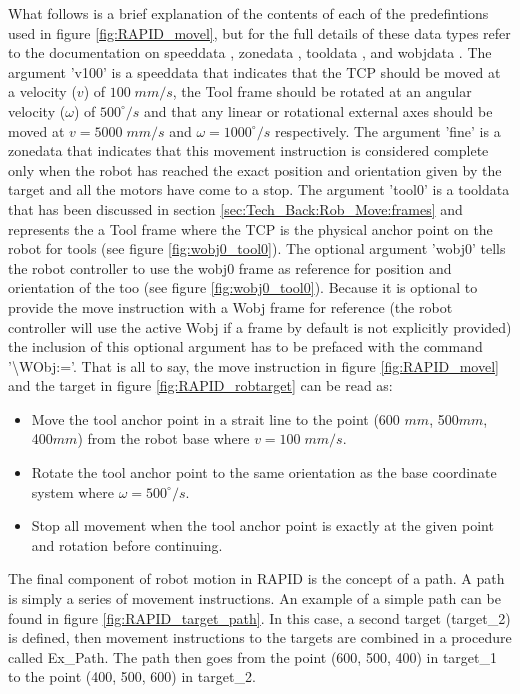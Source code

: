 \documentclass{cslthse-msc}
\begin{document}
What follows is a brief explanation of the contents of each of the predefintions used in figure \ref{fig:RAPID_movel}, but for the full details of these data types refer to the documentation on speeddata \cite[Sec. 3.76]{ABB:rapid_instructions}, zonedata \cite[Sec. 3.103]{ABB:rapid_instructions}, tooldata \cite[Sec. 3.88]{ABB:rapid_instructions}, and wobjdata \cite[Sec. 3.100]{ABB:rapid_instructions}. The argument 'v100' is a speeddata that indicates that the TCP should be moved at a velocity ($v$) of $100 \; mm/s$, the Tool frame should be rotated at an angular velocity ($\omega$) of $500^\circ /s$ and that any linear or rotational external axes should be moved at $v = 5000 \; mm /s$ and $\omega = 1000^\circ /s$ respectively. The argument 'fine' is a zonedata that indicates that this movement instruction is considered complete only when the robot has reached the exact position and orientation given by the target and all the motors have come to a stop. The argument 'tool0' is a tooldata that has been discussed in section \ref{sec:Tech_Back:Rob_Move:frames} and represents the a Tool frame where the TCP is the physical anchor point on the robot for tools (see figure \ref{fig:wobj0_tool0}). The optional argument 'wobj0' tells the robot controller to use the wobj0 frame as reference for position and orientation of the too (see figure \ref{fig:wobj0_tool0}). Because it is optional to provide the move instruction with a Wobj frame for reference (the robot controller will use the active Wobj if a frame by default is not explicitly provided) the inclusion of this optional argument has to be prefaced with the command '\textbackslash WObj:='. That is all to say, the move instruction in figure \ref{fig:RAPID_movel} and the target in figure \ref{fig:RAPID_robtarget} can be read as: 
\begin{itemize}
    \item Move the tool anchor point in a strait line to the point (600 $mm$, 500$mm$, 400$mm$) from the robot base where $v = 100 \; mm /s$. 
    \item Rotate the tool anchor point to the same orientation as the base coordinate system where $\omega = 500^\circ / s$. 
    \item Stop all movement when the tool anchor point is exactly at the given point and rotation before continuing. 
\end{itemize}

The final component of robot motion in RAPID is the concept of a path. A path is simply a series of movement instructions. An example of a simple path can be found in figure \ref{fig:RAPID_target_path}. In this case, a second target (target\_2) is defined, then movement instructions to the targets are combined in a procedure called Ex\_Path. The path then goes from the point (600, 500, 400) in target\_1 to the point (400, 500, 600) in target\_2. 
\end{document}

